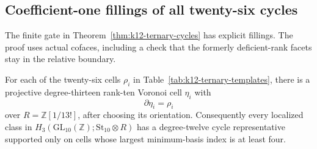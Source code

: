 \subsection{Coefficient-one fillings of all twenty-six cycles}
\label{subsec:k12-ternary-fillings}

The finite gate in Theorem~\ref{thm:k12-ternary-cycles} has explicit
fillings. The proof uses actual cofaces, including a check that the
formerly deficient-rank facets stay in the relative boundary.

\begin{proposition}
\label{prop:k12-index-three-boundaries}
For each of the twenty-six cells $\rho_i$ in
Table~\ref{tab:k12-ternary-templates}, there is a projective
degree-thirteen rank-ten Voronoi cell $\eta_i$ with
\[
                       \partial\eta_i=\rho_i
\]
over $R=\mathbb Z[1/13!]$, after choosing its orientation.
Consequently every localized class in
$H_3(\mathrm{GL}_{10}(\mathbb Z);\mathrm{St}_{10}\otimes R)$
has a degree-twelve cycle representative supported only on cells
whose largest minimum-basis index is at least four.
\end{proposition}

